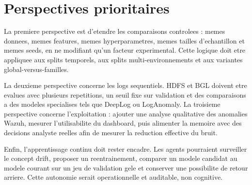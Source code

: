 \section{Perspectives prioritaires}
La premiere perspective est d'etendre les comparaisons controlees : memes donnees, memes features, memes hyperparametres, memes tailles d'echantillon et memes seeds, en ne modifiant qu'un facteur experimental. Cette logique doit etre appliquee aux splits temporels, aux splits multi-environnements et aux variantes global-versus-familles.

La deuxieme perspective concerne les logs sequentiels. HDFS et BGL doivent etre evalues avec plusieurs repetitions, un seuil fixe sur validation et des comparaisons a des modeles specialises tels que DeepLog ou LogAnomaly. La troisieme perspective concerne l'exploitation : ajouter une analyse qualitative des anomalies Wazuh, mesurer l'utilisabilite du dashboard, puis alimenter la memoire avec des decisions analyste reelles afin de mesurer la reduction effective du bruit.

Enfin, l'apprentissage continu doit rester encadre. Les agents pourraient surveiller le concept drift, proposer un reentrainement, comparer un modele candidat au modele courant sur un jeu de validation gele et conserver une possibilite de retour arriere. Cette autonomie serait operationnelle et auditable, non cognitive.

